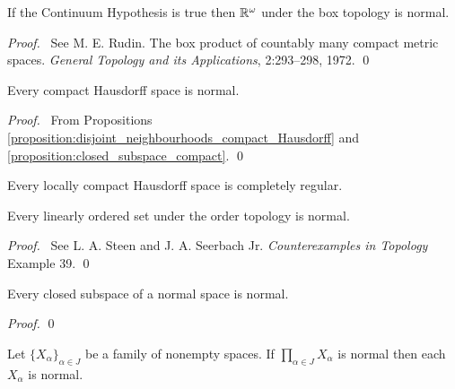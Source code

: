 \begin{theorem}
    If the Continuum Hypothesis is true then $\mathbb{R}^\omega$ under the box topology
    is normal.
\end{theorem}

\begin{proof}
    \pf\ See M. E. Rudin. The box product of countably many compact metric spaces.
    \emph{General Topology and its Applications}, 2:293--298, 1972. \qed
\end{proof}

\begin{theorem}
    Every compact Hausdorff space is normal.
\end{theorem}

\begin{proof}
    \pf\ From Propositions \ref{proposition:disjoint_neighbourhoods_compact_Hausdorff}
    and \ref{proposition:closed_subspace_compact}. \qed
\end{proof}

\begin{corollary}
    Every locally compact Hausdorff space is completely regular.
\end{corollary}

\begin{theorem}
    Every linearly ordered set under the order topology is normal.
\end{theorem}

\begin{proof}
    \pf\ See L. A. Steen and J. A. Seerbach Jr. \emph{Counterexamples in
    Topology} Example 39. \qed
\end{proof}

\begin{proposition}
    \label{proposition:closed_subspace_normal}
    Every closed subspace of a normal space is normal.
\end{proposition}

\begin{proof}
    \pf
    \qed
\end{proof}

\begin{corollary}
    Let $\{ X_\alpha \}_{\alpha \in J}$ be a family of nonempty spaces. If
    $\prod_{\alpha \in J} X_\alpha$ is normal then each $X_\alpha$ is normal.
\end{corollary}

